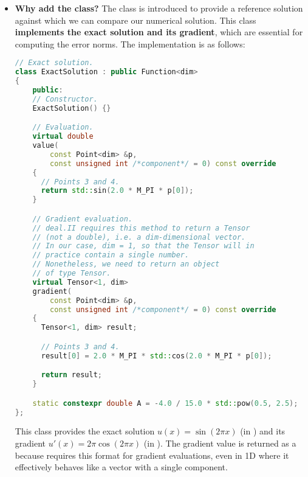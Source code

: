 \begin{itemize}
    \item[\textcolor{Green3}{\faIcon{question-circle}}] \textcolor{Green3}{\textbf{Why add the  class?}} The  class is introduced to provide a reference solution against which we can compare our numerical solution. This class \textbf{implements the exact solution and its gradient}, which are essential for computing the error norms. The implementation is as follows:
    \begin{lstlisting}[language=C++, caption={Exact Solution Class for MMS}]
// Exact solution.
class ExactSolution : public Function<dim>
{
    public:
    // Constructor.
    ExactSolution() {}

    // Evaluation.
    virtual double
    value(
        const Point<dim> &p,
        const unsigned int /*component*/ = 0) const override
    {
      // Points 3 and 4.
      return std::sin(2.0 * M_PI * p[0]);
    }

    // Gradient evaluation.
    // deal.II requires this method to return a Tensor
    // (not a double), i.e. a dim-dimensional vector.
    // In our case, dim = 1, so that the Tensor will in
    // practice contain a single number.
    // Nonetheless, we need to return an object
    // of type Tensor.
    virtual Tensor<1, dim>
    gradient(
        const Point<dim> &p,
        const unsigned int /*component*/ = 0) const override
    {
      Tensor<1, dim> result;

      // Points 3 and 4.
      result[0] = 2.0 * M_PI * std::cos(2.0 * M_PI * p[0]);

      return result;
    }

    static constexpr double A = -4.0 / 15.0 * std::pow(0.5, 2.5);
};\end{lstlisting}
    This class provides the exact solution $u(x) = \sin(2\pi x)$ (in ) and its gradient $u'(x) = 2\pi \cos(2\pi x)$ (in ). The gradient value is returned as a  because  requires this format for gradient evaluations, even in 1D where it effectively behaves like a vector with a single component.


\end{itemize}
